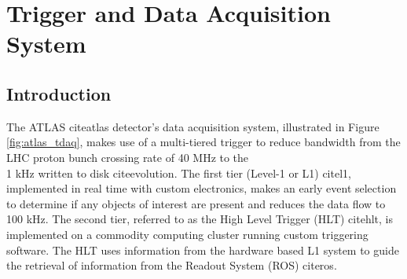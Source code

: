 \chapter{Trigger and Data Acquisition System}

\section{Introduction}%

The ATLAS cite{atlas} detector's data acquisition system, illustrated in Figure \ref{fig:atlas_tdaq}, makes use of a multi-tiered trigger to reduce 
bandwidth from the LHC proton bunch crossing rate of 40 MHz
to the \\1 kHz written to disk cite{evolution}. The first tier (Level-1 or L1) cite{l1}, implemented in real time with custom electronics, 
makes an early event selection to determine if any objects of interest are present and reduces the data flow to 
100 kHz. The second tier, referred to as the High Level Trigger (HLT) cite{hlt}, is implemented on a commodity computing cluster running custom triggering software. The HLT uses information from the
hardware based L1 system to guide the retrieval of information from the Readout System (ROS) cite{ros}. 

